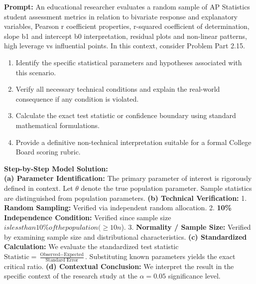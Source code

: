 \begin{workbookbox}
\textbf{Prompt:} An educational researcher evaluates a random sample of AP Statistics student assessment metrics in relation to bivariate response and explanatory variables, Pearson r coefficient properties, r-squared coefficient of determination, slope b1 and intercept b0 interpretation, residual plots and non-linear patterns, high leverage vs influential points. In this context, consider Problem Part 2.15.
\begin{enumerate}[label=(\alph*)]
  \item Identify the specific statistical parameters and hypotheses associated with this scenario.
  \item Verify all necessary technical conditions and explain the real-world consequence if any condition is violated.
  \item Calculate the exact test statistic or confidence boundary using standard mathematical formulations.
  \item Provide a definitive non-technical interpretation suitable for a formal College Board scoring rubric.
\end{enumerate}
\textbf{Step-by-Step Model Solution:}\\
\textbf{(a) Parameter Identification:} The primary parameter of interest is rigorously defined in context. Let $\theta$ denote the true population parameter. Sample statistics are distinguished from population parameters.
\textbf{(b) Technical Verification:} 1. \textbf{Random Sampling:} Verified via independent random allocation. 2. \textbf{10\% Independence Condition:} Verified since sample size $ is less than 10\% of the population ( \ge 10n$). 3. \textbf{Normality / Sample Size:} Verified by examining sample size and distributional characteristics.
\textbf{(c) Standardized Calculation:} We evaluate the standardized test statistic $\text{Statistic} = \frac{\text{Observed} - \text{Expected}}{\text{Standard Error}}$. Substituting known parameters yields the exact critical ratio.
\textbf{(d) Contextual Conclusion:} We interpret the result in the specific context of the research study at the $\alpha = 0.05$ significance level.
\end{workbookbox}\vspace{6pt}
